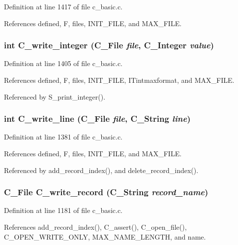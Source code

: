 Definition at line 1417 of file c\_\-basic.c.

References defined, F, files, INIT\_\-FILE, and MAX\_\-FILE.
\subsubsection{\setlength{\rightskip}{0pt plus 5cm}int C\_\-write\_\-integer (\bf{C\_\-File} {\em file}, \bf{C\_\-Integer} {\em value})}\label{c__basic_8c_801469b46559cac4fbfd5e04c4afb89d}




Definition at line 1405 of file c\_\-basic.c.

References defined, F, files, INIT\_\-FILE, ITintmaxformat, and MAX\_\-FILE.

Referenced by S\_\-print\_\-integer().
\subsubsection{\setlength{\rightskip}{0pt plus 5cm}int C\_\-write\_\-line (\bf{C\_\-File} {\em file}, \bf{C\_\-String} {\em line})}\label{c__basic_8c_8e35c0d48b79b341af2f7465403b5709}




Definition at line 1381 of file c\_\-basic.c.

References defined, F, files, INIT\_\-FILE, and MAX\_\-FILE.

Referenced by add\_\-record\_\-index(), and delete\_\-record\_\-index().
\subsubsection{\setlength{\rightskip}{0pt plus 5cm}\bf{C\_\-File} C\_\-write\_\-record (\bf{C\_\-String} {\em record\_\-name})}\label{c__basic_8c_2d6b8c0ebb2ee61a31d8a7f84ca0dc4f}




Definition at line 1181 of file c\_\-basic.c.

References add\_\-record\_\-index(), C\_\-assert(), C\_\-open\_\-file(), C\_\-OPEN\_\-WRITE\_\-ONLY, MAX\_\-NAME\_\-LENGTH, and name.
